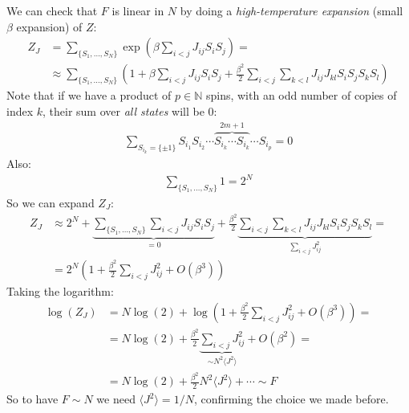 \documentclass[../template.tex]{subfiles}
\begin{document}
We can check that $F$ is linear in $N$ by doing a \textit{high-temperature expansion} (small $\beta$ expansion) of $Z$:
\begin{align*}
    Z_J &= \sum_{\{S_1,\dots, S_N\}} \exp\left(\beta \sum_{i < j} J_{ij} S_i S_j\right) =\\
    &\approx \sum_{\{S_1, \dots, S_N\}} \left(1+\beta \sum_{i < j} J_{ij} S_i S_j + \frac{\beta^2}{2} \sum_{i < j} \sum_{k < l} J_{ij} J_{kl} S_i S_j S_k S_l \right)
\end{align*}   
Note that if we have a product of $p \in \mathbb{N}$ spins, with an odd number of copies of index $k$, their sum over \textit{all states} will be $0$:
\begin{align*}
    \sum_{S_{i_k} = \{\pm1\}} S_{i_1} S_{i_2} \cdots \overbrace{S_{i_k} \cdots S_{i_k}}^{2m+1}  \cdots S_{i_p} = 0
\end{align*}     
Also:
\begin{align*}
    \sum_{\{S_1,\dots,S_N\}} 1 = 2^N
\end{align*}
So we can expand $Z_J$:
\begin{align*}
    Z_J &\approx 2^N + \underbrace{\sum_{\{S_1,\dots, S_N\}} \sum_{i<j} J_{ij} S_i S_j}_{=0} + \frac{\beta^2}{2} \underbrace{{\sum_{i<j} \sum_{k<l} J_{ij} J_{kl} S_i S_j S_k S_l }}_{\sum_{i<j} J_{ij}^2}=\\
    &=  2^N \left(1+\frac{\beta^2}{2} \sum_{i<j}J_{ij}^2 + O(\beta^3) \right)
\end{align*} 
Taking the logarithm:
\begin{align*}
    \log(Z_J) &= N \log (2) + \log\left(1+\frac{\beta^2}{2} \sum_{i<j} J_{ij}^2 + O(\beta^3) \right) = \\
    &= N \log(2) + \frac{\beta^2}{2} \underbrace{\sum_{i<j} J_{ij}^2}_{\sim N^2 \langle J^2 \rangle}  + O(\beta^2) =\\
    &= N \log(2) + \frac{\beta^2}{2} N^2 \langle J^2 \rangle  + \cdots \sim F
\end{align*}
So to have $F \sim N$ we need $\langle J^2 \rangle = 1/N$, confirming the choice we made before.
\end{document}
